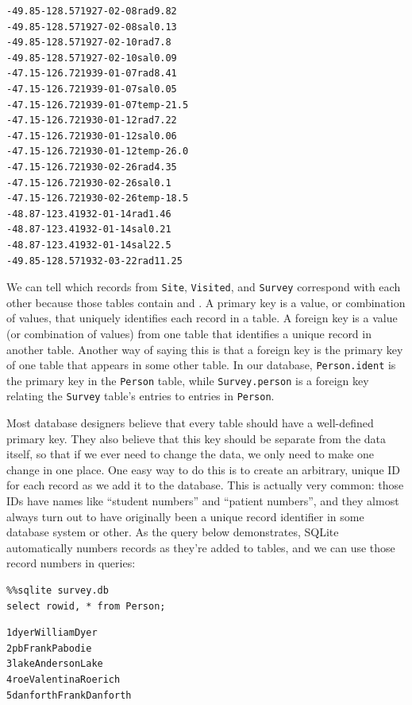 \documentclass{book}
\begin{document}
\begin{verbatim}
-49.85-128.571927-02-08rad9.82
-49.85-128.571927-02-08sal0.13
-49.85-128.571927-02-10rad7.8
-49.85-128.571927-02-10sal0.09
-47.15-126.721939-01-07rad8.41
-47.15-126.721939-01-07sal0.05
-47.15-126.721939-01-07temp-21.5
-47.15-126.721930-01-12rad7.22
-47.15-126.721930-01-12sal0.06
-47.15-126.721930-01-12temp-26.0
-47.15-126.721930-02-26rad4.35
-47.15-126.721930-02-26sal0.1
-47.15-126.721930-02-26temp-18.5
-48.87-123.41932-01-14rad1.46
-48.87-123.41932-01-14sal0.21
-48.87-123.41932-01-14sal22.5
-49.85-128.571932-03-22rad11.25
\end{verbatim}

We can tell which records from \texttt{Site}, \texttt{Visited}, and
\texttt{Survey} correspond with each other because those tables contain
 and
. A primary key is a value, or
combination of values, that uniquely identifies each record in a table.
A foreign key is a value (or combination of values) from one table that
identifies a unique record in another table. Another way of saying this
is that a foreign key is the primary key of one table that appears in
some other table. In our database, \texttt{Person.ident} is the primary
key in the \texttt{Person} table, while \texttt{Survey.person} is a
foreign key relating the \texttt{Survey} table's entries to entries in
\texttt{Person}.

Most database designers believe that every table should have a
well-defined primary key. They also believe that this key should be
separate from the data itself, so that if we ever need to change the
data, we only need to make one change in one place. One easy way to do
this is to create an arbitrary, unique ID for each record as we add it
to the database. This is actually very common: those IDs have names like
``student numbers'' and ``patient numbers'', and they almost always turn
out to have originally been a unique record identifier in some database
system or other. As the query below demonstrates, SQLite automatically
numbers records as they're added to tables, and we can use those record
numbers in queries:

\begin{verbatim}
%%sqlite survey.db
select rowid, * from Person;
\end{verbatim}

\begin{verbatim}
1dyerWilliamDyer
2pbFrankPabodie
3lakeAndersonLake
4roeValentinaRoerich
5danforthFrankDanforth
\end{verbatim}
\end{document}
